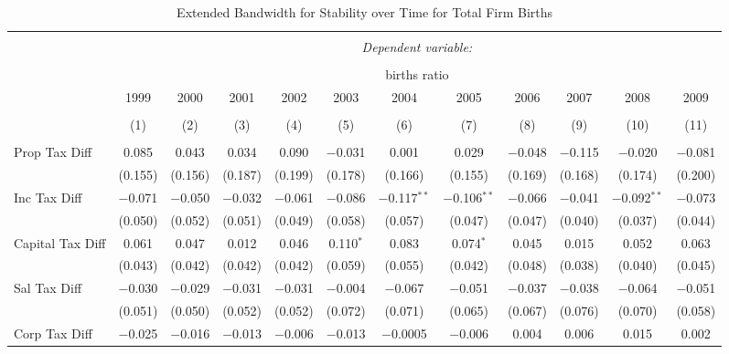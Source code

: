 
\begin{table}[!htbp] \centering 
  \caption{Extended Bandwidth for Stability over Time for  Total Firm Births} 
  \label{-- ebyear} 
\small 
\begin{tabular}{@{\extracolsep{5pt}}lccccccccccc} 
\\[-1.8ex]\hline 
\hline \\[-1.8ex] 
 & \multicolumn{11}{c}{\textit{Dependent variable:}} \\ 
\cline{2-12} 
\\[-1.8ex] & \multicolumn{11}{c}{births ratio} \\ 
 & 1999 & 2000 & 2001 & 2002 & 2003 & 2004 & 2005 & 2006 & 2007 & 2008 & 2009 \\ 
\\[-1.8ex] & (1) & (2) & (3) & (4) & (5) & (6) & (7) & (8) & (9) & (10) & (11)\\ 
\hline \\[-1.8ex] 
 Prop Tax Diff & 0.085 & 0.043 & 0.034 & 0.090 & $-$0.031 & 0.001 & 0.029 & $-$0.048 & $-$0.115 & $-$0.020 & $-$0.081 \\ 
  & (0.155) & (0.156) & (0.187) & (0.199) & (0.178) & (0.166) & (0.155) & (0.169) & (0.168) & (0.174) & (0.200) \\ 
  Inc Tax Diff & $-$0.071 & $-$0.050 & $-$0.032 & $-$0.061 & $-$0.086 & $-$0.117$^{**}$ & $-$0.106$^{**}$ & $-$0.066 & $-$0.041 & $-$0.092$^{**}$ & $-$0.073 \\ 
  & (0.050) & (0.052) & (0.051) & (0.049) & (0.058) & (0.057) & (0.047) & (0.047) & (0.040) & (0.037) & (0.044) \\ 
  Capital Tax Diff & 0.061 & 0.047 & 0.012 & 0.046 & 0.110$^{*}$ & 0.083 & 0.074$^{*}$ & 0.045 & 0.015 & 0.052 & 0.063 \\ 
  & (0.043) & (0.042) & (0.042) & (0.042) & (0.059) & (0.055) & (0.042) & (0.048) & (0.038) & (0.040) & (0.045) \\ 
  Sal Tax Diff & $-$0.030 & $-$0.029 & $-$0.031 & $-$0.031 & $-$0.004 & $-$0.067 & $-$0.051 & $-$0.037 & $-$0.038 & $-$0.064 & $-$0.051 \\ 
  & (0.051) & (0.050) & (0.052) & (0.052) & (0.072) & (0.071) & (0.065) & (0.067) & (0.076) & (0.070) & (0.058) \\ 
  Corp Tax Diff & $-$0.025 & $-$0.016 & $-$0.013 & $-$0.006 & $-$0.013 & $-$0.0005 & $-$0.006 & 0.004 & 0.006 & 0.015 & 0.002 \\ 

\end{tabular}
\end{table}
